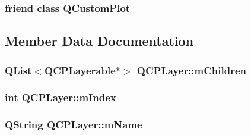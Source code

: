 \subsubsection[{\texorpdfstring{Q\+Custom\+Plot}{QCustomPlot}}]{\setlength{\rightskip}{0pt plus 5cm}friend class {\bf Q\+Custom\+Plot}\hspace{0.3cm}{\ttfamily [friend]}}\hypertarget{classQCPLayer_a1cdf9df76adcfae45261690aa0ca2198}{}\label{classQCPLayer_a1cdf9df76adcfae45261690aa0ca2198}


\subsection{Member Data Documentation}
\subsubsection[{\texorpdfstring{m\+Children}{mChildren}}]{\setlength{\rightskip}{0pt plus 5cm}Q\+List$<${\bf Q\+C\+P\+Layerable}$\ast$$>$ Q\+C\+P\+Layer\+::m\+Children\hspace{0.3cm}{\ttfamily [protected]}}\hypertarget{classQCPLayer_a704aa71bba469383c3a3c598c1ec0d28}{}\label{classQCPLayer_a704aa71bba469383c3a3c598c1ec0d28}
\subsubsection[{\texorpdfstring{m\+Index}{mIndex}}]{\setlength{\rightskip}{0pt plus 5cm}int Q\+C\+P\+Layer\+::m\+Index\hspace{0.3cm}{\ttfamily [protected]}}\hypertarget{classQCPLayer_a122088bcab6cec76a52b75ce8606605b}{}\label{classQCPLayer_a122088bcab6cec76a52b75ce8606605b}
\subsubsection[{\texorpdfstring{m\+Name}{mName}}]{\setlength{\rightskip}{0pt plus 5cm}Q\+String Q\+C\+P\+Layer\+::m\+Name\hspace{0.3cm}{\ttfamily [protected]}}\hypertarget{classQCPLayer_a91e6298183cb4b9dfd4efdfaf1ecc220}{}\label{classQCPLayer_a91e6298183cb4b9dfd4efdfaf1ecc220}
